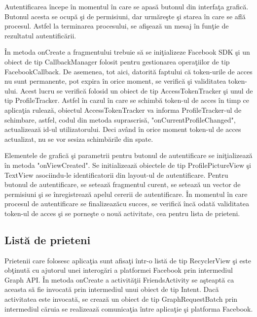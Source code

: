 	Autentificarea \^{i}ncepe \^{i}n momentul \^{i}n care se apas\u{a} butonul din interfa\c{t}a grafic\u{a}. Butonul acesta se ocup\u{a} \c{s}i de permisiuni, dar urm\u{a}re\c{s}te \c{s}i starea \^{i}n care se afl\u{a} procesul. Astfel la terminarea procesului, se afi\c{s}eaz\u{a} un mesaj \^{i}n fun\c{t}ie de rezultatul autentific\u{a}rii.
	
	\^{I}n metoda onCreate a fragmentului trebuie s\u{a} se ini\c{t}ializeze Facebook SDK \c{s}i un obiect de tip CallbackManager folosit pentru gestionarea opera\c{t}iilor de tip FacebookCallback. De asemenea, tot aici, datorit\u{a} faptului c\u{a} token-urile de acces nu sunt permanente, pot expira \^{i}n orice moment, se verific\u{a} \c{s}i validitatea token-ului. Acest lucru se verific\u{a} folosid un obiect de tip AccessTokenTracker \c{s}i unul de tip ProfileTracker. Astfel \^{i}n cazul \^{i}n care se schimb\u{a} token-ul de acces \^{i}n timp ce aplica\c{t}ia ruleaz\u{a}, obiectul AccessTokenTracker va informa ProfileTracker-ul de schimbare, astfel, codul din metoda suprascris\u{a}, "onCurrentProfileChanged", actualizeaz\u{a} id-ul utilizatorului. Deci av\^{a}nd \^{i}n orice moment token-ul de acces actualizat, nu se vor sesiza schimb\u{a}rile din spate.
	
	Elementele de grafic\u{a} \c{s}i parametrii pentru butonul de autentificare se ini\c{t}ializeaz\u{a} \^{i}n metoda "onViewCreated". Se initializeaz\u{a} obiectele de tip ProfilePictureView \c{s}i TextView asociindu-le identificatorii din layout-ul de autentificare. Pentru butonul de autentificare, se seteaz\u{a} fragmentul curent, se seteaz\u{a} un vector de permisiuni \c{s}i se \^{i}nregistreaz\u{a} apelul cererii de autentificare. \^{I}n momentul \^{i}n care procesul de autentificare se finalizeaz\u{a}cu succes, se verific\u{a} \^{i}nc\u{a} odat\u{a} validitatea token-ul de acces \c{s}i se porne\c{s}te o nou\u{a} activitate, cea pentru lista de prieteni.

\subsection{List\u{a} de prieteni}

Prietenii care folosesc aplica\c{t}ia sunt afisa\c{t}i \^{i}ntr-o list\u{a} de tip RecyclerView \c{s}i este ob\c{t}inut\u{a} cu ajutorul unei interog\u{a}ri a platformei Facebook prin intermediul Graph API. \^{I}n metoda onCreate a activit\u{a}\c{t}ii FriendsActivity se a\c{s}teapt\u{a} ca aceasta s\u{a} fie invocat\u{a} prin intermediul unui obiect de tip Intent. Dac\u{a} activitatea este invocat\u{a}, se creaz\u{a} un obiect de tip GraphRequestBatch prin intermediul c\u{a}ruia se realizeaz\u{a} comunica\c{t}ia \^{i}ntre aplica\c{t}ie \c{s}i platforma Facebook. 

